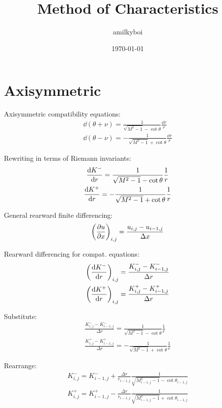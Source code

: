 \documentclass[11pt, fleqn, twoside]{report}
\title{Method of Characteristics}
\author{amilkyboi}
\date{\today}
\DeclarePairedDelimiter\p{\lparen}{\rparen}
\newcommand{\DD}[1]{\Delta#1} %
\newcommand{\odv}{\dv}
\begin{document}
\maketitle
\tableofcontents
\newpage

\chapter{Axisymmetric}
\label{c:axisymmetric}

Axisymmetric compatibility equations:
\begin{gather*}
    \dd(\theta + \nu) = \frac{1}{\sqrt{M^2 - 1} - \cot{\theta}}\frac{\dd{r}}{r} \\
    \dd(\theta - \nu) = -\frac{1}{\sqrt{M^2 - 1} + \cot{\theta}}\frac{\dd{r}}{r}
\end{gather*}

Rewriting in terms of Riemann invariants:
\begin{gather*}
    \odv{K^-}{r} = \frac{1}{\sqrt{M^2 - 1} - \cot{\theta}}\frac{1}{r} \\
    \odv{K^+}{r} = -\frac{1}{\sqrt{M^2 - 1} + \cot{\theta}}\frac{1}{r}
\end{gather*}

General rearward finite differencing:
\begin{equation*}
    \p*{\pdv{u}{x}}_{i,j} = \frac{u_{i,j} - u_{i-1,j}}{\DD{x}}
\end{equation*}

Rearward differencing for compat. equations:
\begin{gather*}
    \p*{\odv{K^-}{r}}_{i,j} = \frac{K_{i,j}^- - K_{i-1,j}^-}{\DD{r}} \\
    \p*{\odv{K^+}{r}}_{i,j} = \frac{K_{i,j}^+ - K_{i-1,j}^+}{\DD{r}}
\end{gather*}

Substitute:
\begin{gather*}
    \frac{K_{i,j}^- - K_{i-1,j}^-}{\DD{r}} = \frac{1}{\sqrt{M^2 - 1} - \cot{\theta}}\frac{1}{r} \\
    \frac{K_{i,j}^+ - K_{i-1,j}^+}{\DD{r}} = -\frac{1}{\sqrt{M^2 - 1} + \cot{\theta}}\frac{1}{r}
\end{gather*}

Rearrange:
\begin{gather*}
    K_{i,j}^- = K_{i-1,j}^- + \frac{\DD{r}}{r_{i-1,j}}\frac{1}{\sqrt{M_{i-1,j}^2 - 1} - \cot{\theta_{i-1,j}}} \\
    K_{i,j}^+ = K_{i-1,j}^+ - \frac{\DD{r}}{r_{i-1,j}}\frac{1}{\sqrt{M_{i-1,j}^2 - 1} + \cot{\theta_{i-1,j}}}
\end{gather*}
\end{document}
